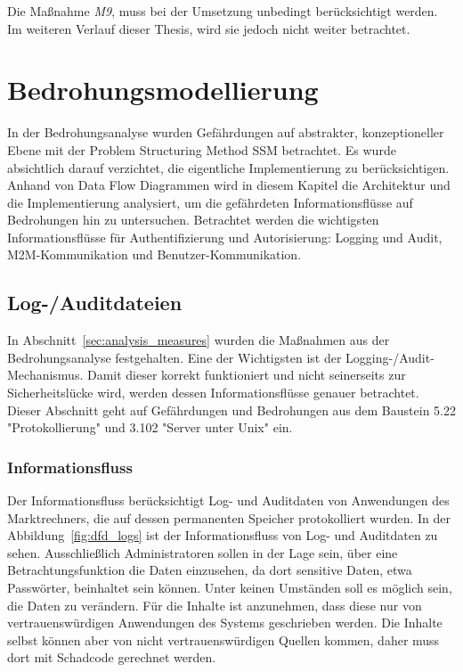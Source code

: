 \documentclass[11pt,a4paper]{report}
\begin{document}
Die Maßnahme \textit{M9}, muss bei der Umsetzung unbedingt berücksichtigt werden. Im weiteren Verlauf dieser Thesis, wird sie jedoch nicht weiter betrachtet.

\chapter{Bedrohungsmodellierung} \label{chap:threat_modelling}

In der Bedrohungsanalyse wurden Gefährdungen auf abstrakter, konzeptioneller Ebene mit der Problem Structuring Method SSM betrachtet. Es wurde absichtlich darauf verzichtet, die eigentliche Implementierung zu berücksichtigen. Anhand von Data Flow Diagrammen wird in diesem Kapitel die Architektur und die Implementierung analysiert, um die gefährdeten Informationsflüsse auf Bedrohungen hin zu untersuchen. Betrachtet werden die wichtigsten Informationsflüsse für Authentifizierung und Autorisierung: Logging und Audit, M2M-Kommunikation und Benutzer-Kommunikation.

\section{Log-/Auditdateien} \label{sec:bmod_logaud} 

In Abschnitt~\ref{sec:analysis_measures} wurden die Maßnahmen aus der Bedrohungsanalyse festgehalten. Eine der Wichtigsten ist der Logging-/Audit-Mechanismus. Damit dieser korrekt funktioniert und nicht seinerseits zur Sicherheitslücke wird, werden dessen Informationsflüsse genauer betrachtet. Dieser Abschnitt geht auf Gefährdungen und Bedrohungen aus dem Baustein 5.22 "Protokollierung" und 3.102 "Server unter Unix" ein.

\subsection{Informationsfluss}

Der Informationsfluss berücksichtigt Log- und Auditdaten von Anwendungen des Marktrechners, die auf dessen permanenten Speicher protokolliert wurden. In der Abbildung~\ref{fig:dfd_logs} ist der Informationsfluss von Log- und Auditdaten zu sehen. Ausschließlich Administratoren sollen in der Lage sein, über eine  Betrachtungsfunktion die Daten einzusehen, da dort sensitive Daten, etwa Passwörter, beinhaltet sein können. Unter keinen Umständen soll es möglich sein, die Daten zu verändern. Für die Inhalte ist anzunehmen, dass diese nur von vertrauenswürdigen Anwendungen des Systems geschrieben werden. Die Inhalte selbst können aber von nicht vertrauenswürdigen Quellen kommen, daher muss dort mit Schadcode gerechnet werden.
\end{document}
